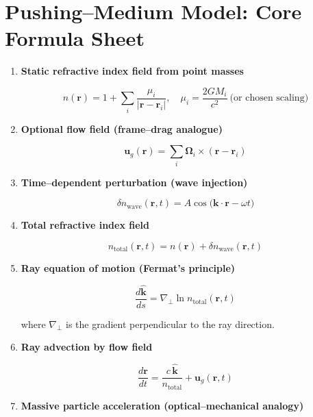 \documentclass{article}
\begin{document}
\section*{Pushing--Medium Model: Core Formula Sheet}

\begin{enumerate}
    \item \textbf{Static refractive index field from point masses}
    

\[
    n(\mathbf{r}) = 1 + \sum_i \frac{\mu_i}{\lvert \mathbf{r} - \mathbf{r}_i \rvert},
    \quad \mu_i = \frac{2 G M_i}{c^2} \ \text{(or chosen scaling)}
    \]



    \item \textbf{Optional flow field (frame--drag analogue)}
    

\[
    \mathbf{u}_g(\mathbf{r}) = \sum_i \boldsymbol{\Omega}_i \times (\mathbf{r} - \mathbf{r}_i)
    \]



    \item \textbf{Time--dependent perturbation (wave injection)}
    

\[
    \delta n_{\mathrm{wave}}(\mathbf{r}, t) = A \cos\!\big( \mathbf{k} \cdot \mathbf{r} - \omega t \big)
    \]



    \item \textbf{Total refractive index field}
    

\[
    n_{\mathrm{total}}(\mathbf{r}, t) = n(\mathbf{r}) + \delta n_{\mathrm{wave}}(\mathbf{r}, t)
    \]



    \item \textbf{Ray equation of motion (Fermat's principle)}
    

\[
    \frac{d\hat{\mathbf{k}}}{ds} = \nabla_{\!\perp} \ln n_{\mathrm{total}}(\mathbf{r}, t)
    \]


    where $\nabla_{\!\perp}$ is the gradient perpendicular to the ray direction.

    \item \textbf{Ray advection by flow field}
    

\[
    \frac{d\mathbf{r}}{dt} = \frac{c\,\hat{\mathbf{k}}}{n_{\mathrm{total}}} + \mathbf{u}_g(\mathbf{r}, t)
    \]



    \item \textbf{Massive particle acceleration (optical--mechanical analogy)}
    


\end{enumerate}
\end{document}
